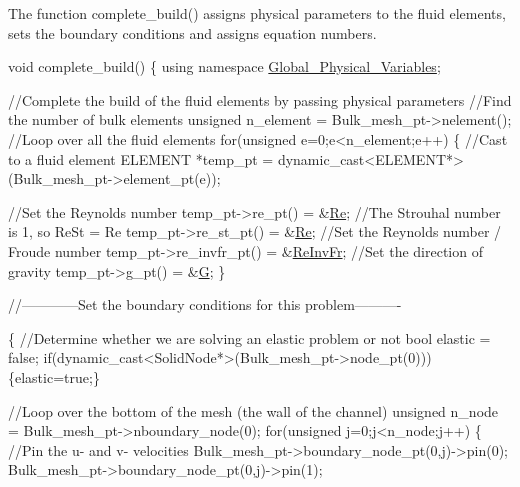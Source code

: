 The function {\ttfamily complete\+\_\+build()} assigns physical parameters to the fluid elements, sets the boundary conditions and assigns equation numbers.  
\begin{DoxyCodeInclude}
 \textcolor{keywordtype}{void} complete\_build()
  \{
   \textcolor{keyword}{using namespace }\hyperlink{namespaceGlobal__Physical__Variables}{Global\_Physical\_Variables};
   
   \textcolor{comment}{//Complete the build of the fluid elements by passing physical parameters}
   \textcolor{comment}{//Find the number of bulk elements}
   \textcolor{keywordtype}{unsigned} n\_element = Bulk\_mesh\_pt->nelement();
   \textcolor{comment}{//Loop over all the fluid elements }
   \textcolor{keywordflow}{for}(\textcolor{keywordtype}{unsigned} e=0;e<n\_element;e++)
    \{
     \textcolor{comment}{//Cast to a fluid element}
     ELEMENT *temp\_pt = \textcolor{keyword}{dynamic\_cast<}ELEMENT*\textcolor{keyword}{>}(Bulk\_mesh\_pt->element\_pt(e));
     
     \textcolor{comment}{//Set the Reynolds number}
     temp\_pt->re\_pt() = &\hyperlink{namespaceGlobal__Physical__Variables_ab814e627d2eb5bc50318879d19ab16b9}{Re};
     \textcolor{comment}{//The Strouhal number is 1, so ReSt = Re}
     temp\_pt->re\_st\_pt() = &\hyperlink{namespaceGlobal__Physical__Variables_ab814e627d2eb5bc50318879d19ab16b9}{Re};
     \textcolor{comment}{//Set the Reynolds number / Froude number}
     temp\_pt->re\_invfr\_pt() = &\hyperlink{namespaceGlobal__Physical__Variables_aa6286f02b476912dd7550eced538331a}{ReInvFr};
     \textcolor{comment}{//Set the direction of gravity}
     temp\_pt->g\_pt() = &\hyperlink{namespaceGlobal__Physical__Variables_aa868968dead376240a69f9152bd599b9}{G};
    \}
   
   \textcolor{comment}{//------------Set the boundary conditions for this problem----------}

   \{
    \textcolor{comment}{//Determine whether we are solving an elastic problem or not}
    \textcolor{keywordtype}{bool} elastic = \textcolor{keyword}{false};
    \textcolor{keywordflow}{if}(dynamic\_cast<SolidNode*>(Bulk\_mesh\_pt->node\_pt(0))) \{elastic=\textcolor{keyword}{true};\}

    \textcolor{comment}{//Loop over the bottom of the mesh (the wall of the channel)}
    \textcolor{keywordtype}{unsigned} n\_node = Bulk\_mesh\_pt->nboundary\_node(0);
    \textcolor{keywordflow}{for}(\textcolor{keywordtype}{unsigned} j=0;j<n\_node;j++)
     \{
      \textcolor{comment}{//Pin the u- and v- velocities}
      Bulk\_mesh\_pt->boundary\_node\_pt(0,j)->pin(0);
      Bulk\_mesh\_pt->boundary\_node\_pt(0,j)->pin(1);


\end{DoxyCodeInclude}
